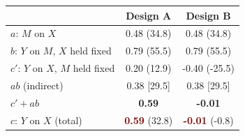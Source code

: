 \begin{tabular}{@{}lcc@{}}
\toprule
 & Design A & Design B \\
\midrule
$a$: $M$ on $X$ & 0.48 (34.8) & 0.48 (34.8) \\
$b$: $Y$ on $M$, $X$ held fixed & 0.79 (55.5) & 0.79 (55.5) \\
$c'$: $Y$ on $X$, $M$ held fixed & 0.20 (12.9) & -0.40 (-25.5) \\
\midrule
$ab$ (indirect) & 0.38 [29.5] & 0.38 [29.5] \\
$c' + ab$ & \textcolor{DeepNavy}{\bfseries 0.59} & \textcolor{DeepNavy}{\bfseries -0.01} \\
$c$: $Y$ on $X$ (total) & \textcolor{Maroon}{\bfseries 0.59} (32.8) & \textcolor{Maroon}{\bfseries -0.01} (-0.8) \\
\bottomrule
\end{tabular}
